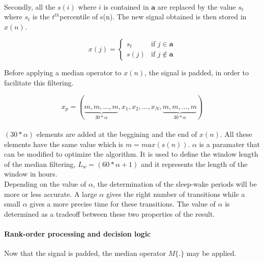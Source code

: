 \documentclass[a4paper,10pt]{article}
\begin{document}
\paragraph{}
Secondly, all the $s(i)$ where $i$ is contained in $\mathbf{a}$ are replaced by the value $s_t$ where $s_t$ is the $t^{th}$percentile of s(n). The new signal obtained is then stored in $x(n)$.

\begin{equation}
x(j) = \left\{
    \begin{array}{ll}
        s_t & \mbox{if } j \in \mathbf{a} \\
        s(j) & \mbox{if } j \notin \mathbf{a}
    \end{array}
\right.
\end{equation}

Before applying a median operator to $x(n)$, the signal is padded, in order to facilitate this filtering. 

\begin{equation}
\label{padding}
x_p = (\underbrace{m, m, \ldots, m}_{30 * \alpha}, x_1, x_2, \ldots, x_N, \underbrace{m, m, \ldots, m}_{30 * \alpha})
\end{equation}

\paragraph{}
$(30 * \alpha)$ elements are added at the beggining and the end of $x(n)$. All these elements have the same value which is $m = max(s(n))$. $\alpha$ is a paramater that can be modified to optimize the algorithm. It is used to define the window length of the median filtering, $L_w = (60 * \alpha + 1)$ and it represents the length of the window in hours. \\

Depending on the value of $\alpha$, the determination of the sleep-wake periods will be more or less accurate. A large $\alpha$ gives the right number of transitions while a small $\alpha$ gives a more precise time for these transitions. The value of $\alpha$ is determined as a tradeoff between these two properties of the result.


\paragraph{Rank-order processing and decision logic\\}
Now that the signal is padded, the median operator $M\{.\}$ may be applied.
\end{document}
